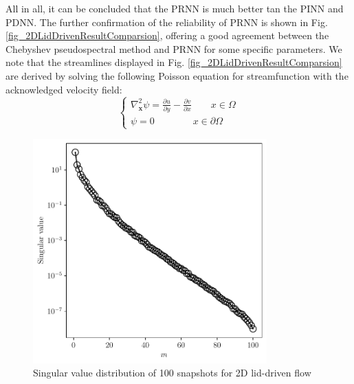 \documentclass[preprint, 10pt]{elsarticle}
\begin{document}
All in all, it can be concluded that the PRNN is much better tan the PINN and PDNN. The further confirmation of the reliability of PRNN is shown in Fig. \ref{fig_2DLidDrivenResultComparsion}, offering a good agreement between the Chebyshev pseudospectral method and PRNN for some specific parameters. We note that the streamlines displayed in Fig. \ref{fig_2DLidDrivenResultComparsion} are derived by solving the following Poisson equation for streamfunction  with the acknowledged velocity field:
\begin{equation}
\left \{
\begin{aligned}
{\nabla_{\mathbf{x}} ^2}{\psi} 
 = \frac{\partial u}{\partial y} - \frac{\partial v}{\partial x} \qquad x \in \Omega\\
\psi = 0  \qquad \qquad    x \in \partial \Omega
\end{aligned}
 \right .
\label{eq_Streamfunction}
\end{equation}

\begin{figure}[!ht]
  \centering
  \includegraphics[width=9cm]{../../pythonNN/2DLidDriven/fig/SingularValues_100.pdf}
\caption{Singular value distribution of 100 snapshots for 2D lid-driven flow}
\label{fig_2DLidDrivenSingularValues}
\end{figure}
\end{document}
